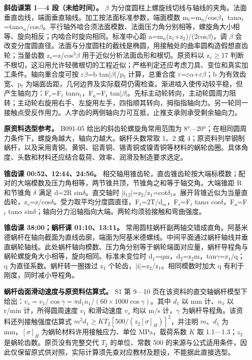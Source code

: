 \documentclass[zihao=5,a4paper,UTF8,fontset=fandol]{ctexart}
\begin{document}
\textbf{斜齿课第 1—4 段（未给时间）。} $\beta$ 为分度圆柱上螺旋线切线与轴线的夹角。法面垂直齿线，端面垂直轴线。加工按法面标准参数，端面模数 m$_{t}$=m$_{n}$/cos$\beta$，tan$\alpha$$_{t}$=tan$\alpha$$_{n}$/cos$\beta$。平行轴外啮合须法面模数、法面压力角分别相等，螺旋角大小相等、旋向相反；内啮合时旋向相同。标准中心距 a=m$_{n}$(z$_{1}$+z$_{2}$)/(2cos$\beta$)，调 $\beta$ 会改变分度圆直径。法面与分度圆柱的截线是椭圆，用接触处的曲率圆构造假想直齿轮；当量齿数 z$_{v}$=z/cos$^{3}$$\beta$ 用于近似分析法面齿形和根切。原资料以 z$_{v}$$\ge$17 判断不根切，这沿用允许轻微根切的工程近似；严格判定还应考虑刀具、变位和真实加工条件。轴向重合度可按 $\varepsilon$$\beta$=b tan|$\beta$|/p$_{t}$ 计算，总重合度 $\varepsilon$=$\varepsilon$$\alpha$+$\varepsilon$$\beta$；b 为有效齿宽、p$_{t}$ 为端面齿距，几何边界及实际载荷仍需检查。渐进啮入使传动较平稳，但产生轴向力：F$_{r}$=F$_{t}$ tan$\alpha$$_{t}$，F$_{a}$=F$_{t}$ tan|$\beta$|。先标主动轮转向，主动轮圆周力阻转；主动轮右旋用右手、左旋用左手，四指顺其转向，拇指指轴向力。另一轮同一接触点受反作用力。人字齿的两侧轴向力可互抵，止推支承则承受剩余轴向力。


\textbf{原资料选型参考。} B091-05 给出的斜齿轮螺旋角常用范围为 8°—20°；在相同圆周力条件下，螺旋角越大，轴向力越大。蜗杆头数常取 1、2 或 4；原资料列举钢制蜗杆，以及采用青铜、黄铜、铝青铜、锡青铜或镍青铜等材料的蜗轮齿圈。具体角度、头数和材料还应结合载荷、效率、润滑及制造要求选定。


\textbf{锥齿课 00:52、12:44、24:56。} 相交轴用锥齿轮，直齿锥齿轮按大端标模数；配对的大端模数及压力角相等，两节锥共顶，节锥角之和等于轴交角。大端锥距 R 和节锥角 $\delta$ 满足 d=2R sin$\delta$。直交轴时 |i$_{1}$$_{2}$|=z$_{2}$/z$_{1}$=cot$\delta$$_{1}$。展开背锥近似为当量直齿轮，z$_{v}$=z/cos$\delta$。受力取平均分度圆直径，F$_{t}$=2T/d$_{m}$，F$_{r}$=F$_{t}$ tan$\alpha$ cos$\delta$，F$_{a}$=F$_{t}$ tan$\alpha$ sin$\delta$；轴向分力沿轴指向大端。两轮均须验接触和弯曲强度。


\textbf{锥齿课 38:00；蜗杆课 01:10、13:11。} 常用圆柱蜗杆副两轴交错成直角。阿基米德蜗杆在轴向截面为直线齿廓，端面为阿基米德螺线。中间平面通过蜗杆轴线并垂直蜗轮轴线。此处蜗杆轴向模数、压力角分别等于蜗轮端面对应量，蜗杆导程角与蜗轮螺旋角大小相等，旋向相同。标准未变位时 d$_{1}$=qm，d$_{2}$=z$_{2}$m，tan$\gamma$=z$_{1}$/q；q 为直径系数。蜗杆转一圈拨过 z$_{1}$ 个轮齿，|i|=z$_{2}$/z$_{1}$。相同模数时加大 q 有利于刚度，同时减小导程角。


\textbf{蜗杆齿面滑动速度与原资料估算式。} S1 第 9—10 页在该资料的直交轴蜗杆模型下给出：$v_s=v_1/\cos\gamma=\pi d_1 n_1/(60\times1000\cos\gamma)$。其中 $d_1$ 以 mm 计、$n_1$ 以 r/min 计，所得圆周速度 $v_1$ 和滑动速度 $v_s$ 均以 m/s 计，$\gamma$ 为蜗杆导程角。该资料还列接触强度估算式 $m^2d_1\geq KT_2[500/(z_2[\sigma]_H)]^2$，并注明 $m$、$d_1$ 为 mm，$[\sigma]_H$ 为蜗轮材料许用接触应力、单位 MPa，载荷系数 $K$ 取 1.1—1.3；$z_2$ 是蜗轮齿数。原页没有完整交代 $T_2$ 的单位、常数 500 的来源与公式适用条件，因此仅保留原式供对照，实际计算须先查对应教材及题设，不能据此直接选型。
\end{document}
